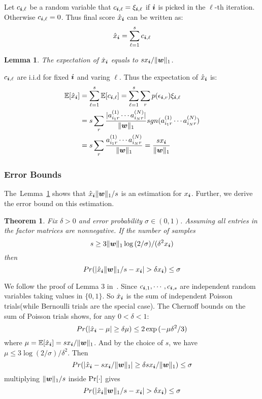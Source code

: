 \documentclass[10pt,journal,compsoc]{IEEEtran}
\newcommand{\Sca}[3]{{#1}^{(#2)}_{i_#2#3}}%
\newcommand{\anr}[2]{\Sca{a}{#1}{#2}}
\newcommand{\score}[1]{\xi_{\V{i},#1}}
\newcommand{\V}[1]{{\boldsymbol{{\MakeLowercase{#1}}}}}
\newcommand{\predx}{\hat{x}_{\V{i}}}
\newcommand{\norm}[2]{\|#1\|_{#2}}
\newcommand{\Lem}[1]{Lemma~\ref{lem:#1}}
\newtheorem{lemma}{Lemma}
\newtheorem{theorem}{Theorem}
\begin{document}
Let $c_{\V{i},\ell}$ be a random variable that $c_{\V{i},\ell}=\score{\ell}$ if $\V{i}$ is picked in the $\ell$-th iteration. Otherwise $c_{\V{i},\ell}=0$. Thus final score $\predx$ can be written as:
\begin{equation}\label{eq:CoreBasicScore}
\predx = \sum_{\ell=1}^{s} c_{\V{i},\ell}
\end{equation}

\begin{lemma}\label{lem:CoreBasicExpectation}
	The expectation of $\predx$ equals to $sx_{\V{i}}/\norm{\V{w}}{1}$.
\end{lemma}

\begin{IEEEproof}
	$c_{\V{i},\ell}$ are i.i.d for fixed $\V{i}$ and varing $\ell$.
	Thus the expectation of $\predx$ is:
	\begin{align*}
	\mathbb{E}[\predx]
	& = \sum_{\ell=1}^{s}\mathbb{E}[c_{\V{i},\ell}] = \sum_{\ell=1}^{s}\sum_{r} p(\epsilon_{\V{i},r})\score{\ell} \\
	& = s\sum_{r} \frac{|\anr{1}{r}\cdots\anr{N}{r}|}{\norm{\V{W}}{1}}
	sgn(\anr{1}{r}\cdots\anr{N}{r})\\
	& = s\sum_{r} \frac{\anr{1}{r}\cdots\anr{N}{r}}{\norm{\V{W}}{1}}
	= \frac{sx_{\V{i}}}{\norm{\V{w}}{1}}
	\end{align*}
\end{IEEEproof}

\subsubsection{Error Bounds}
The~\Lem{CoreBasicExpectation} shows that $\predx\norm{\V{w}}{1}/s$ is an estimation for $x_{\V{i}}$. Further, we derive the error bound on this estimation.
\begin{theorem}\label{theo:CoreBasicBound}
	Fix $\delta > 0$ and error probability $\sigma\in(0,1)$.
	Assuming all entries in the factor matrices are nonnegative.
	If the number of samples
	\[
	s \geq 3\norm{\V{w}}{1}\log{(2/\sigma)}/(\delta^2 x_{\V{i}})
	\]
	then
	\[
	Pr(|\predx\norm{\V{W}}{1}/s - x_{\V{i}}| > \delta x_{\V{i}}) \leq \sigma
	\]
\end{theorem}

\begin{IEEEproof}
	We follow the proof of Lemma 3 in~\cite{BaPiKoSe15}.
	Since  $c_{\V{i},1},\cdots,c_{\V{i},s}$
	are independent random variables taking values in $\{0,1\}$.
	So $\predx$ is the sum of independent Poisson trials(while Bernoulli trials are the special case).
	The Chernoff bounds on the sum of Poisson trials shows, for any $0 <\delta <1 $:
	\[
	Pr(|\predx - \mu|\geq\delta\mu) \leq 2\exp{(-\mu\delta^2/3)}
	\]
	where $\mu=\mathbb{E}[\predx]=sx_{\V{i}}/\norm{\V{W}}{1}$.
	And by the choice of $s$, we have
	$\mu\leq 3\log{(2/\sigma)/\delta^2}$.
	Then
	\[
	Pr(|\predx-sx_{\V{i}}/\norm{\V{W}}{1}|\geq\delta sx_{\V{i}}/\norm{\V{W}}{1}) \leq \sigma
	\]
	multiplying $\norm{\V{W}}{1}/s$ inside ${\rm Pr}[\cdot]$ gives
	\[
	Pr(|\predx\norm{\V{W}}{1}/s - x_{\V{i}}| > \delta x_{\V{i}}) \leq \sigma
	\]
\end{IEEEproof}
\end{document}
